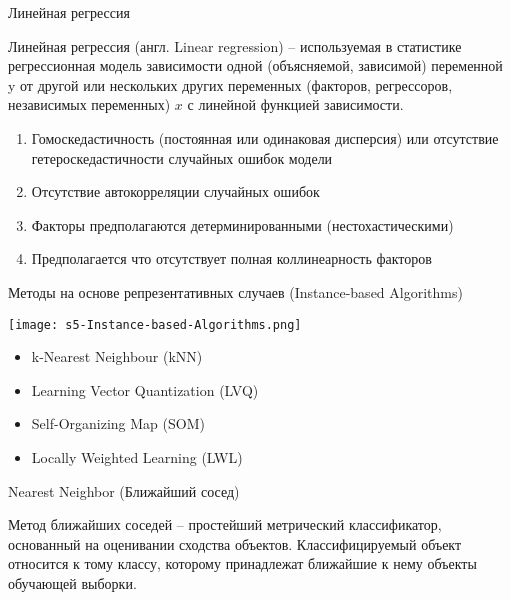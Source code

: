 \documentclass[pdf, intlimits, 9pt, unicode]{beamer}
\begin{document}
\begin{frame}{Линейная регрессия}

\small

Линейная регрессия (англ. Linear regression) -- используемая в статистике регрессионная модель зависимости одной (объясняемой, зависимой) переменной y от другой или нескольких других переменных (факторов, регрессоров, независимых переменных) $x$ с линейной функцией зависимости.\pause


\begin{enumerate}
\item Гомоскедастичность (постоянная или одинаковая дисперсия) или отсутствие гетероскедастичности случайных ошибок модели\pause
\item Отсутствие автокорреляции случайных ошибок\pause
\item Факторы предполагаются детерминированными (нестохастическими)\pause
\item Предполагается что отсутствует полная коллинеарность факторов
\end{enumerate}


\end{frame}





\begin{frame}{Методы на основе репрезентативных случаев (Instance-based Algorithms)}

\begin{center}\texttt{[image: s5-Instance-based-Algorithms.png]}\end{center}

\begin{itemize}
\item k-Nearest Neighbour (kNN)
\item Learning Vector Quantization (LVQ)
\item Self-Organizing Map (SOM)
\item Locally Weighted Learning (LWL)
\end{itemize}

\end{frame}




\begin{frame}{Nearest Neighbor (Ближайший сосед)}

Метод ближайших соседей -- простейший метрический классификатор, основанный на оценивании сходства объектов. \pause Классифицируемый объект относится к тому классу, которому принадлежат ближайшие к нему объекты обучающей выборки. 

\end{frame}
\end{document}
